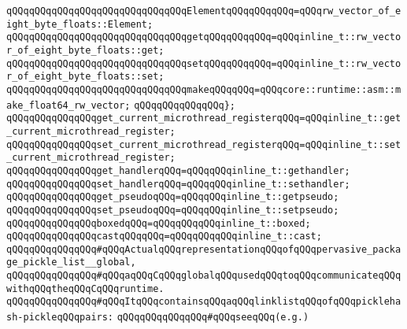 \verb|qQQqqQQqqQQqqQQqqQQqqQQqqQQqqQQqElementqQQqqQQqqQQq=qQQqrw_vector_of_eight_byte_floats::Element;|\newline
\newline
\verb|qQQqqQQqqQQqqQQqqQQqqQQqqQQqqQQqgetqQQqqQQqqQQq=qQQqinline_t::rw_vector_of_eight_byte_floats::get;|\newline
\verb|qQQqqQQqqQQqqQQqqQQqqQQqqQQqqQQqsetqQQqqQQqqQQq=qQQqinline_t::rw_vector_of_eight_byte_floats::set;|\newline
\newline
\verb|qQQqqQQqqQQqqQQqqQQqqQQqqQQqqQQqmakeqQQqqQQq=qQQqcore::runtime::asm::make_float64_rw_vector;|\newline
\verb|qQQqqQQqqQQqqQQq};|\newline
\newline
\verb|qQQqqQQqqQQqqQQqget_current_microthread_registerqQQq=qQQqinline_t::get_current_microthread_register;|\newline
\verb|qQQqqQQqqQQqqQQqset_current_microthread_registerqQQq=qQQqinline_t::set_current_microthread_register;|\newline
\newline
\verb|qQQqqQQqqQQqqQQqget_handlerqQQq=qQQqqQQqinline_t::gethandler;|\newline
\verb|qQQqqQQqqQQqqQQqset_handlerqQQq=qQQqqQQqinline_t::sethandler;|\newline
\newline
\verb|qQQqqQQqqQQqqQQqget_pseudoqQQq=qQQqqQQqinline_t::getpseudo;|\newline
\verb|qQQqqQQqqQQqqQQqset_pseudoqQQq=qQQqqQQqinline_t::setpseudo;|\newline
\newline
\newline
\verb|qQQqqQQqqQQqqQQqboxedqQQq=qQQqqQQqqQQqinline_t::boxed;|\newline
\verb|qQQqqQQqqQQqqQQqcastqQQqqQQq=qQQqqQQqqQQqinline_t::cast;|\newline
\newline
\verb|qQQqqQQqqQQqqQQq#qQQqActualqQQqrepresentationqQQqofqQQqpervasive_package_pickle_list__global,|\newline
\verb|qQQqqQQqqQQqqQQq#qQQqaqQQqCqQQqglobalqQQqusedqQQqtoqQQqcommunicateqQQqwithqQQqtheqQQqCqQQqruntime.|\newline
\verb|qQQqqQQqqQQqqQQq#qQQqItqQQqcontainsqQQqaqQQqlinklistqQQqofqQQqpicklehash-pickleqQQqpairs:|\newline
\verb|qQQqqQQqqQQqqQQq#qQQqseeqQQq(e.g.)|\newline
